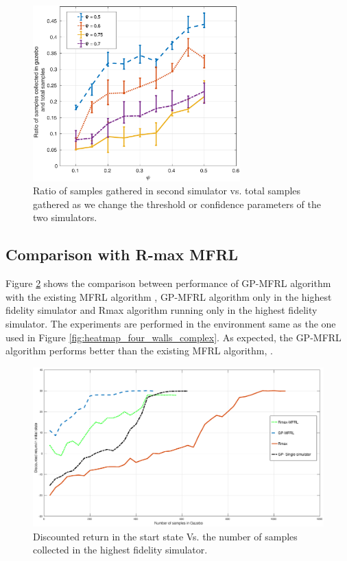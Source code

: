 \documentclass[12pt]{report}
\begin{document}
\begin{figure}[htp]
	\centering
	\includegraphics[width=8cm]{thre.eps} 
	\caption{Ratio of samples gathered in second simulator vs. total samples gathered as we change the threshold or confidence parameters of the two simulators.}
   \label{fig:threshold}
\end{figure}

\subsection{Comparison with R-max MFRL}
Figure \ref{fig:value_function} shows the comparison between performance of GP-MFRL algorithm with the existing MFRL algorithm \cite{cutler2014reinforcement}, GP-MFRL algorithm only in the highest fidelity simulator and Rmax algorithm running only in the highest fidelity simulator. The experiments are performed in the environment same as the one used in Figure \ref{fig:heatmap_four_walls_complex}. As expected, the GP-MFRL algorithm performs better than the existing MFRL algorithm, \cite{cutler2014reinforcement}.
\begin{figure}[htp]
	\centering 
    \includegraphics[width=12cm]{reward.eps}
	\caption{ Discounted return in the start state Vs. the number of samples collected in the highest fidelity simulator.}
   \label{fig:value_function}
\end{figure}
\end{document}
